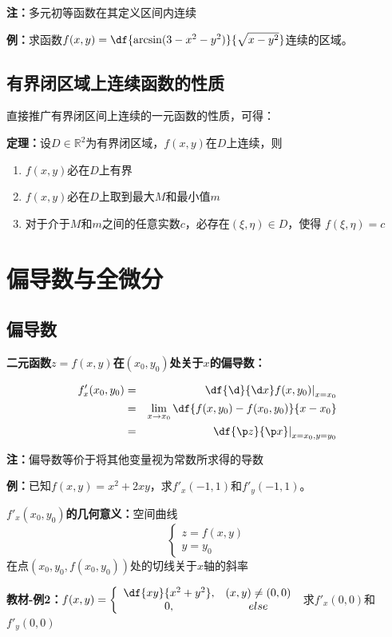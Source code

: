 {\bf 注：}多元初等函数在其定义区间内连续

{\bf 例：}求函数$f(x,y)=\df{\arcsin(3-x^2-y^2)}{\sqrt{x-y^2}}$连续的区域。

\subsection{有界闭区域上连续函数的性质}

直接推广有界闭区间上连续的一元函数的性质，可得：

{\bf 定理：}设$D\in\mathbb{R}^2$为有界闭区域，$f(x,y)$在$D$上连续，则
\begin{enumerate}[(1)]
  \setlength{\itemindent}{1cm}
  \item $f(x,y)$必在$D$上有界
  \item $f(x,y)$必在$D$上取到最大$M$和最小值$m$
  \item 对于介于$M$和$m$之间的任意实数$c$，必存在$(\xi,\eta)\in{D}$，使得
  $f(\xi,\eta)=c$
\end{enumerate}

\section{偏导数与全微分}

\subsection{偏导数}

{\bf 二元函数$z=f(x,y)$在$(x_0,y_0)$处关于$x$的偏导数：}

\begin{eqnarray*}
	{f'_x(x_0,y_0)}  & = &
	\left.\df{\d}{\d x}f(x,y_0)\right|_{x=x_0} \\ 
	& = & \lim\limits_{x\to x_0}\df{f(x,y_0)-f(x_0,y_0)}{x-x_0} \\
	& = & {\left.\df{\p z}{\p x}\right|_{x=x_0,y=y_0}}
\end{eqnarray*}

{\bf 注：}偏导数等价于将其他变量视为常数所求得的导数

{\bf 例：}已知$f(x,y)=x^2+2xy$，求$f'_x(-1,1)$和$f'_y(-1,1)$。

{\bf $f'_x(x_0,y_0)$的几何意义：}空间曲线
$$\left\{\begin{array}{l}
z=f(x,y)\\ y=y_0
\end{array}\right.$$
在点$(x_0,y_0,f(x_0,y_0))$处的切线关于$x$轴的斜率

{\bf 教材-例2：}$f(x,y)=\left\{\begin{array}{cc}
	\df{xy}{x^2+y^2}, & (x,y)\ne (0,0)\\
	0, & else
\end{array}\right.$
求$f'_x(0,0)$和$f'_y(0,0)$

